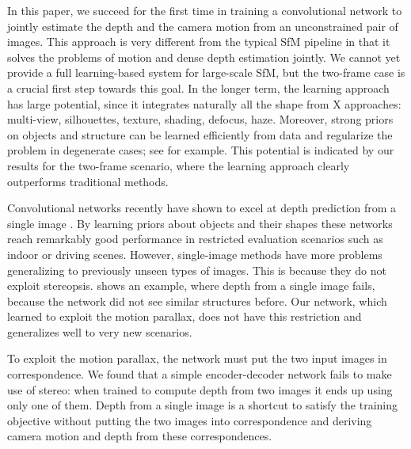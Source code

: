 \documentclass[10pt,twocolumn,letterpaper]{article}
\begin{document}
In this paper, we succeed for the first time in training a convolutional network to jointly estimate the depth and the camera motion from an unconstrained pair of images. 
This approach is very different from the typical SfM pipeline in that it solves the problems of motion and dense depth estimation jointly.
We cannot yet provide a full learning-based system for large-scale SfM, but the two-frame case is a crucial first step towards this goal. 
In the longer term, the learning approach has large potential, since it integrates naturally all the shape from X approaches: multi-view, silhouettes, texture, shading, defocus, haze. 
Moreover, strong priors on objects and structure can be learned efficiently from data and regularize the problem in degenerate cases; see  for example. 
This potential is indicated by our results for the two-frame scenario, where the learning approach clearly outperforms traditional methods. 




Convolutional networks recently have shown to excel at depth prediction from a single image \cite{eigen_predicting_2015,eigen_predicting_2014,liu_learning_2015}.
By learning priors about objects and their shapes these networks reach remarkably good performance in restricted evaluation scenarios such as indoor or driving scenes. 
However, single-image methods have more problems generalizing to previously unseen types of images.
This is because they do not exploit stereopsis. 
 shows an example, where depth from a single image fails, because the network did not see similar structures before. 
Our network, which learned to exploit the motion parallax, does not have this restriction and generalizes well to very new scenarios. 

To exploit the motion parallax, the network must put the two input images in correspondence.
We found that a simple encoder-decoder network fails to make use of stereo: when trained to compute depth from two images it ends up using only one of them.
Depth from a single image is a shortcut to satisfy the training objective
without putting the two images into correspondence and deriving camera motion and depth from these correspondences.
\end{document}
